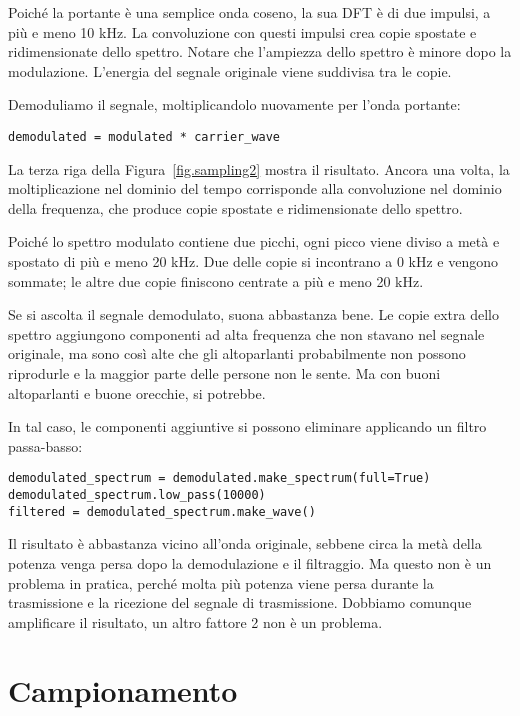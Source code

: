 \documentclass[12pt,a4paper]{book}
\begin{document}
Poiché la portante è una semplice onda coseno, la sua DFT è di due impulsi, a più e meno 10 kHz. La convoluzione con questi impulsi crea copie spostate e ridimensionate dello spettro. Notare che l'ampiezza dello spettro è minore dopo la modulazione. L'energia del segnale originale viene suddivisa tra le copie.

Demoduliamo il segnale, moltiplicandolo nuovamente per l'onda portante:

\begin{verbatim} 
demodulated = modulated * carrier_wave
 \end{verbatim} 

La terza riga della Figura~\ref{fig.sampling2} mostra il risultato. Ancora una volta, la moltiplicazione nel dominio del tempo corrisponde alla convoluzione nel dominio della frequenza, che produce copie spostate e ridimensionate dello spettro.

Poiché lo spettro modulato contiene due picchi, ogni picco viene diviso a metà e spostato di più e meno 20 kHz. Due delle copie si incontrano a 0 kHz e vengono sommate; le altre due copie finiscono centrate a più e meno 20 kHz.

Se si ascolta il segnale demodulato, suona abbastanza bene. Le copie extra dello spettro aggiungono componenti ad alta frequenza che non stavano nel segnale originale, ma sono così alte che gli altoparlanti probabilmente non possono riprodurle e la maggior parte delle persone non le sente. Ma con buoni altoparlanti e buone orecchie, si potrebbe.

In tal caso, le componenti aggiuntive si possono eliminare applicando un filtro passa-basso:

\begin{verbatim} 
demodulated_spectrum = demodulated.make_spectrum(full=True)
demodulated_spectrum.low_pass(10000)
filtered = demodulated_spectrum.make_wave()
 \end{verbatim} 

Il risultato è abbastanza vicino all'onda originale, sebbene circa la metà della potenza venga persa dopo la demodulazione e il filtraggio. Ma questo non è un problema in pratica, perché molta più potenza viene persa durante la trasmissione e la ricezione del segnale di trasmissione. Dobbiamo comunque amplificare il risultato, un altro fattore 2 non è un problema.

\section{Campionamento} 
\end{document}
